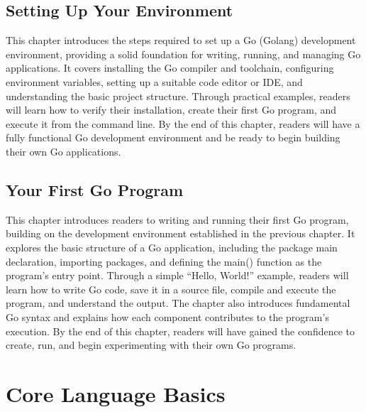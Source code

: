 \documentclass[12pt,oneside]{book}
\begin{document}
\chapter{Setting Up Your Environment}
\begin{chaptersummary}
This chapter introduces the steps required to set up a Go (Golang) development environment, providing a solid foundation for writing, running, and managing Go applications. It covers installing the Go compiler and toolchain, configuring environment variables, setting up a suitable code editor or IDE, and understanding the basic project structure. Through practical examples, readers will learn how to verify their installation, create their first Go program, and execute it from the command line. By the end of this chapter, readers will have a fully functional Go development environment and be ready to begin building their own Go applications.
\end{chaptersummary}





\chapter{Your First Go Program}
\begin{chaptersummary}
This chapter introduces readers to writing and running their first Go program, building on the development environment established in the previous chapter. It explores the basic structure of a Go application, including the package main declaration, importing packages, and defining the main() function as the program’s entry point. Through a simple “Hello, World!” example, readers will learn how to write Go code, save it in a source file, compile and execute the program, and understand the output. The chapter also introduces fundamental Go syntax and explains how each component contributes to the program’s execution. By the end of this chapter, readers will have gained the confidence to create, run, and begin experimenting with their own Go programs.
\end{chaptersummary}




\part{Core Language Basics}
\end{document}
